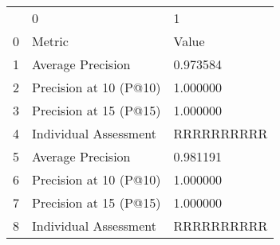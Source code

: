 \begin{tabular}{lll}
 & 0 & 1 \\
0 & Metric & Value \\
1 & Average Precision & 0.973584 \\
2 & Precision at 10 (P@10) & 1.000000 \\
3 & Precision at 15 (P@15) & 1.000000 \\
4 & Individual Assessment & RRRRRRRRRR \\
5 & Average Precision & 0.981191 \\
6 & Precision at 10 (P@10) & 1.000000 \\
7 & Precision at 15 (P@15) & 1.000000 \\
8 & Individual Assessment & RRRRRRRRRR \\
\end{tabular}
